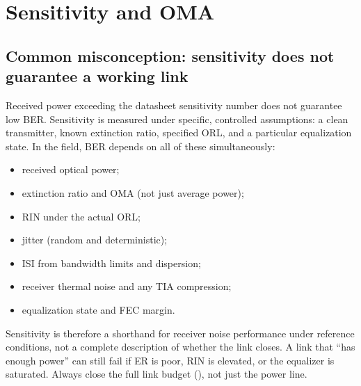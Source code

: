 
\section{Sensitivity and OMA}
\label{sec:sensitivity}

\subsection{Common misconception: sensitivity does not guarantee a working link}

Received power exceeding the datasheet sensitivity number does not guarantee low
BER. Sensitivity is measured under specific, controlled assumptions: a clean
transmitter, known extinction ratio, specified ORL, and a particular equalization
state. In the field, BER depends on all of these simultaneously:

\begin{itemize}
\item received optical power;
\item extinction ratio and OMA (not just average power);
\item RIN under the actual ORL;
\item jitter (random and deterministic);
\item ISI from bandwidth limits and dispersion;
\item receiver thermal noise and any TIA compression;
\item equalization state and FEC margin.
\end{itemize}

Sensitivity is therefore a shorthand for receiver noise performance under reference
conditions, not a complete description of whether the link closes. A link that
``has enough power'' can still fail if ER is poor, RIN is elevated, or the
equalizer is saturated. Always close the full link budget
(), not just the power line.


